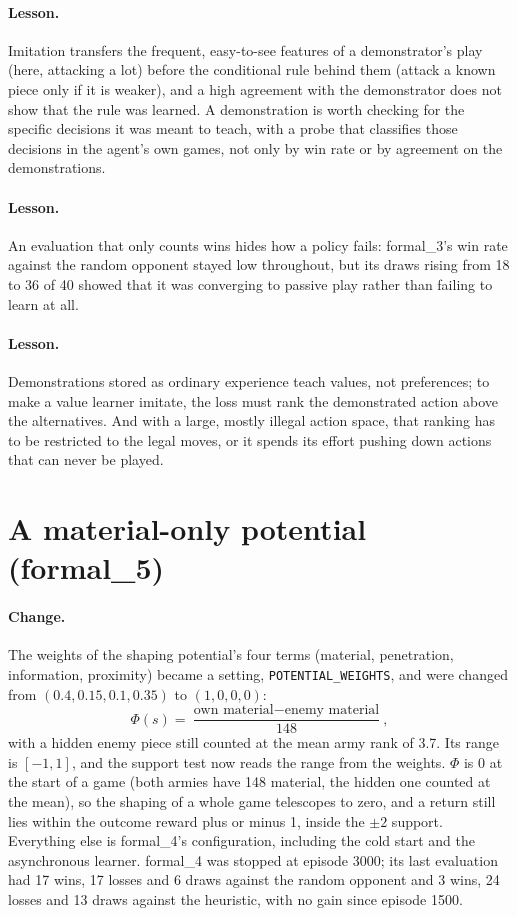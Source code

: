\paragraph{Lesson.} Imitation transfers the frequent, easy-to-see features of a demonstrator's
play (here, attacking a lot) before the conditional rule behind them (attack a known piece only
if it is weaker), and a high agreement with the demonstrator does not show that the rule was
learned. A demonstration is worth checking for the specific decisions it was meant to teach, with
a probe that classifies those decisions in the agent's own games, not only by win rate or by
agreement on the demonstrations.

\paragraph{Lesson.} An evaluation that only counts wins hides how a policy fails: formal\_3's
win rate against the random opponent stayed low throughout, but its draws rising from 18 to 36
of 40 showed that it was converging to passive play rather than failing to learn at all.

\paragraph{Lesson.} Demonstrations stored as ordinary experience teach values, not preferences;
to make a value learner imitate, the loss must rank the demonstrated action above the
alternatives. And with a large, mostly illegal action space, that ranking has to be restricted to
the legal moves, or it spends its effort pushing down actions that can never be played.

\section{A material-only potential (formal\_5)}

\paragraph{Change.} The weights of the shaping potential's four terms (material, penetration,
information, proximity) became a setting, \texttt{POTENTIAL\_WEIGHTS}, and were changed from
$(0.4, 0.15, 0.1, 0.35)$ to $(1, 0, 0, 0)$:
\[
\Phi(s) = \frac{\text{own material} - \text{enemy material}}{148},
\]
with a hidden enemy piece still counted at the mean army rank of 3.7. Its range is $[-1, 1]$, and
the support test now reads the range from the weights. $\Phi$ is 0 at the start of a game (both
armies have 148 material, the hidden one counted at the mean), so the shaping of a whole game
telescopes to zero, and a return still lies within the outcome reward plus or minus 1, inside the
$\pm 2$ support. Everything else is formal\_4's configuration, including the cold start and the
asynchronous learner. formal\_4 was stopped at episode 3000; its last evaluation had 17 wins,
17 losses and 6 draws against the random opponent and 3 wins, 24 losses and 13 draws against the
heuristic, with no gain since episode 1500.

